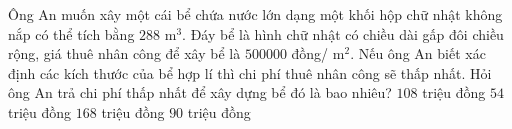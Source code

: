 \begin{ex}%
	Ông An muốn xây một cái bể chứa nước lớn dạng một khối hộp chữ nhật không nắp có thể tích bằng $288$ m$^3$. Đáy bể là hình chữ nhật có chiều dài gấp đôi chiều rộng, giá thuê nhân công để xây bể là $500000$ đồng/ m$^2$. Nếu ông An biết xác định các kích thước của bể hợp lí thì chi phí thuê nhân công sẽ thấp nhất. Hỏi ông An trả chi phí thấp nhất để xây dựng bể đó là bao nhiêu?
	\choice
	{\True $108$ triệu đồng}
	{$54$ triệu đồng}
	{$168$ triệu đồng}
	{$90$ triệu đồng}
\end{ex}
